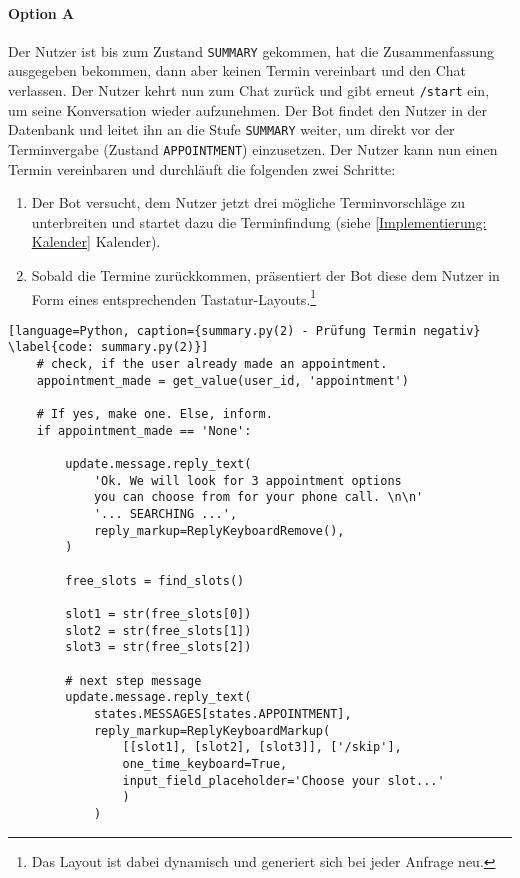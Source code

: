             \paragraph{Option A} Der Nutzer ist bis zum Zustand \verb|SUMMARY| gekommen, hat die Zusammenfassung ausgegeben bekommen, dann aber keinen Termin vereinbart und den Chat verlassen. Der Nutzer kehrt nun zum Chat zurück und gibt erneut \verb|/start| ein, um seine Konversation wieder aufzunehmen. Der Bot findet den Nutzer in der Datenbank und leitet ihn an die Stufe \verb|SUMMARY| weiter, um direkt vor der Terminvergabe (Zustand \verb|APPOINTMENT|) einzusetzen. Der Nutzer kann nun einen Termin vereinbaren und durchläuft die folgenden zwei Schritte: 
                \begin{enumerate}
                    \item Der Bot versucht, dem Nutzer jetzt drei mögliche Terminvorschläge zu unterbreiten und startet dazu die Terminfindung (siehe \ref{Implementierung: Kalender} Kalender).
                    \item Sobald die Termine zurückkommen, präsentiert der Bot diese dem Nutzer in Form eines entsprechenden Tastatur-Layouts.\footnote{Das Layout ist dabei dynamisch und generiert sich bei jeder Anfrage neu.}
                \end{enumerate}
            
            \begin{lstlisting}[language=Python, caption={summary.py(2) - Prüfung Termin negativ} \label{code: summary.py(2)}]
    # check, if the user already made an appointment. 
    appointment_made = get_value(user_id, 'appointment')
    
    # If yes, make one. Else, inform.
    if appointment_made == 'None':
        
        update.message.reply_text(
            'Ok. We will look for 3 appointment options 
            you can choose from for your phone call. \n\n'
            '... SEARCHING ...',
            reply_markup=ReplyKeyboardRemove(),
        )

        free_slots = find_slots()

        slot1 = str(free_slots[0])
        slot2 = str(free_slots[1])
        slot3 = str(free_slots[2])

        # next step message
        update.message.reply_text(
            states.MESSAGES[states.APPOINTMENT],
            reply_markup=ReplyKeyboardMarkup(
                [[slot1], [slot2], [slot3]], ['/skip'], 
                one_time_keyboard=True, 
                input_field_placeholder='Choose your slot...'
                )
            )
            \end{lstlisting}
            
